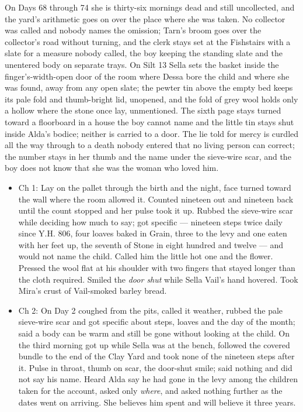 \documentclass{design/chronicle}
\begin{document}
{On Days 68 through 74 she is thirty-six mornings dead and still uncollected, and the yard’s arithmetic goes on over the place where she was taken. No collector was called and nobody names the omission; Tarn’s broom goes over the collector’s road without turning, and the clerk stays set at the Fishstairs with a slate for a measure nobody called, the boy keeping the standing slate and the unentered body on separate trays. On Silt 13 Sella sets the basket inside the finger’s-width-open door of the room where Dessa bore the child and where she was found, away from any open slate; the pewter tin above the empty bed keeps its pale fold and thumb-bright lid, unopened, and the fold of grey wool holds only a hollow where the stone once lay, unmentioned. The sixth page stays turned toward a floorboard in a house the boy cannot name and the little tin stays shut inside Alda’s bodice; neither is carried to a door. The lie told for mercy is curdled all the way through to a death nobody entered that no living person can correct; the number stays in her thumb and the name under the sieve-wire scar, and the boy does not know that she was the woman who loved him.

\begin{itemize}[leftmargin=1.4em,itemsep=1pt,topsep=3pt,parsep=0pt]

\item Ch 1: Lay on the pallet through the birth and the night, face turned toward the wall where the room allowed it. Counted nineteen out and nineteen back until the count stopped and her pulse took it up. Rubbed the sieve-wire scar while deciding how much to say; got specific --- nineteen steps twice daily since Y.H. 806, four loaves baked in Grain, three to the levy and one eaten with her feet up, the seventh of Stone in eight hundred and twelve --- and would not name the child. Called him the little hot one and the flower. Pressed the wool flat at his shoulder with two fingers that stayed longer than the cloth required. Smiled the \emph{door shut} while Sella Vail’s hand hovered. Took Mira’s crust of Vail-smoked barley bread.

\item Ch 2: On Day 2 coughed from the pits, called it weather, rubbed the pale sieve-wire scar and got specific about steps, loaves and the day of the month; said a body can be warm and still be gone without looking at the child. On the third morning got up while Sella was at the bench, followed the covered bundle to the end of the Clay Yard and took none of the nineteen steps after it. Pulse in throat, thumb on scar, the door-shut smile; said nothing and did not say his name. Heard Alda say he had gone in the levy among the children taken for the account, asked only \emph{where}, and asked nothing further as the dates went on arriving. She believes him spent and will believe it three years.


\end{itemize}}
\end{document}
